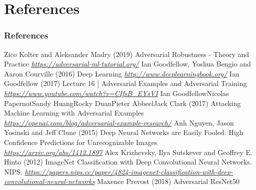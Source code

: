 \section{References}
\begin{vbframe}
\frametitle{References}
\footnotesize{
\begin{thebibliography}{99}
 Zico Kolter and Aleksander Madry (2019)
\newblock Adversarial Robustness - Theory and Practice
\newblock \emph{\url{https://adversarial-ml-tutorial.org/}}
 Ian Goodfellow, Yoshua Bengio and Aaron Courville (2016)
\newblock Deep Learning
\newblock \emph{\url{http://www.deeplearningbook.org/}}
 Ian Goodfellow (2017)
\newblock Lecture 16 | Adversarial Examples and Adversarial Training
\newblock \emph{\url{https://www.youtube.com/watch?v=CIfsB_EYsVI}}
  Ian GoodfellowNicolas PapernotSandy HuangRocky DuanPieter AbbeelJack Clark (2017)
\newblock Attacking Machine Learning with Adversarial Examples
\newblock \emph{\url{https://openai.com/blog/adversarial-example-research/}}
 Anh Nguyen, Jason Yosinski and Jeff Clune (2015)
\newblock Deep Neural Networks are Easily Fooled: High Confidence Predictions for Unrecognizable Images
\newblock \emph{\url{https://arxiv.org/abs/1412.1897}}
 Alex Krizhevsky, Ilya Sutskever and Geoffrey E. Hinto (2012)
\newblock ImageNet Classification with Deep Convolutional Neural Networks. NIPS. 
\newblock \emph{\url{https://papers.nips.cc/paper/4824-imagenet-classification-with-deep-convolutional-neural-networks}}
 Maxence Prevost (2018)
\newblock Adversarial ResNet50 

\end{thebibliography}}
\end{vbframe}
